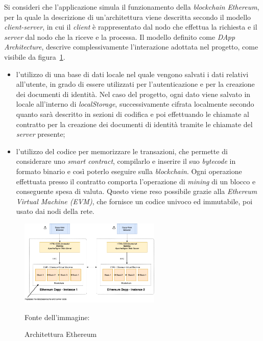 Si consideri che l'applicazione simula il funzionamento della \textit{blockchain} \textit{Ethereum}, per la quale la descrizione di un'architettura viene
descritta secondo il modello \textit{client-server}, in cui il \textit{client} è rappresentato dal nodo che effettua la richiesta e il \textit{server} dal nodo che la riceve e la processa.
Il modello definito come \textit{DApp Architecture}, descrive complessivamente l'interazione adottata nel progetto, come visibile da figura~\ref{fig:eth-architecture}.
\begin{itemize}
\item l'utilizzo di una base di dati locale nel quale vengono salvati i dati relativi all'utente, in grado di essere utilizzati per l'autenticazione e per la creazione dei documenti di identità.
Nel caso del progetto, ogni dato viene salvato in locale all'interno di \textit{localStorage}, successivamente cifrata localmente secondo quanto sarà descritto in sezioni di codifica e 
poi effettuando le chiamate al contratto per la creazione dei documenti di identità tramite le chiamate del \textit{server} presente;
\item l'utilizzo del codice per memorizzare le transazioni, che permette di considerare uno \textit{smart contract}, compilarlo e inserire il suo \textit{bytecode} in formato binario
e così poterlo eseguire sulla \textit{blockchain}. Ogni operazione effettuata presso il contratto comporta l'operazione di \textit{mining} di un blocco e conseguente spesa di valuta.
Questo viene reso possibile grazie alla \textit{Ethereum Virtual Machine (EVM)}, che fornisce un codice univoco ed immutabile, poi usato dai nodi della rete.
\end{itemize}

\begin{figure}[ht]
    \centering
    \includegraphics[width=0.6\textwidth, alt={Descrizione dell'architettura di Ethereum}]{immagini/ethereum-architecture.png}
    \caption{Architettura Ethereum} Fonte dell'immagine:~\cite{site:etharchitecture}\label{fig:eth-architecture}
\end{figure}

